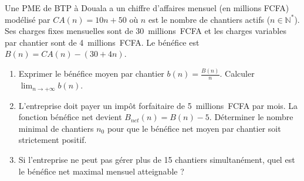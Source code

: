 \documentclass[11pt]{article}
\begin{document}
\begin{exercice}
Une PME de BTP à Douala a un chiffre d'affaires mensuel (en millions FCFA) modélisé par $CA(n) = 10n + 50$ où $n$ est le nombre de chantiers actifs ($n \in \mathbb{N}^*$). Ses charges fixes mensuelles sont de \SI{30}{millions FCFA} et les charges variables par chantier sont de \SI{4}{millions FCFA}. Le bénéfice est $B(n) = CA(n) - (30 + 4n)$.
\begin{enumerate}
    \item Exprimer le bénéfice moyen par chantier $b(n) = \frac{B(n)}{n}$. Calculer $\lim_{n \to +\infty} b(n)$.
    \item L'entreprise doit payer un impôt forfaitaire de \SI{5}{millions FCFA} par mois. La fonction bénéfice net devient $B_{net}(n) = B(n) - 5$. Déterminer le nombre minimal de chantiers $n_0$ pour que le bénéfice net moyen par chantier soit strictement positif.
    \item Si l'entreprise ne peut pas gérer plus de 15 chantiers simultanément, quel est le bénéfice net maximal mensuel atteignable ?
\end{enumerate}
\end{exercice}
\end{document}
